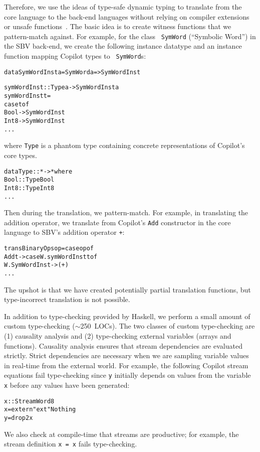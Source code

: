\documentclass[9pt]{sigplanconf}
\newenvironment{code}{\begin{alltt}\footnotesize}{\end{alltt}}
\begin{document}
Therefore, we use the ideas of type-safe dynamic typing to translate from the
core language to the back-end languages without relying on compiler extensions
or unsafe functions~\cite{typing}.  The basic idea is to create witness
functions that we pattern-match against.  For example, for the class {\tt
  SymWord} (``Symbolic Word'') in the SBV back-end, we create the following
instance datatype and an instance function mapping Copilot types to {\tt
  SymWord}s:
%
\begin{code}
data SymWordInst a = SymWord a => SymWordInst

symWordInst :: Type a -> SymWordInst a
symWordInst t =
  case t of
    Bool   -> SymWordInst
    Int8   -> SymWordInst
    ...
\end{code}
%
where {\tt Type} is a phantom type containing concrete representations of
Copilot's core types.
%
\begin{code}
data Type :: * -> * where
  Bool    :: Type Bool
  Int8    :: Type Int8
  ...  
\end{code}
%
Then during the translation, we pattern-match.  For example, in translating the
addition operator, we translate from Copilot's {\tt Add} constructor in the core
language to SBV's addition operator {\tt +}:
%
\begin{code}
transBinaryOps op = case op of
  Add t -> case W.symWordInst t of 
             W.SymWordInst ->  (+)
  ...
\end{code}
%
The upshot is that we have created potentially partial translation functions,
but type-incorrect translation is not possible.








In addition to type-checking provided by Haskell, we perform a small amount of
custom type-checking ($\sim$250~LOCs).  The two classes of custom type-checking
are (1) causality analysis and (2) type-checking external variables (arrays and
functions).  Causality analysis ensures that stream dependencies are evaluated
strictly.  Strict dependencies are necessary when we are sampling variable
values in real-time from the external world.  For example, the following Copilot
stream equations fail type-checking since {\tt y} initially depends on values
from the variable {\tt x} before any values have been generated:
%
\begin{code}
x :: Stream Word8
x = extern "ext" Nothing
y = drop 2 x 
\end{code}
%
We also check at compile-time that streams are productive; for example, the
stream definition {\tt x = x} fails type-checking.
\end{document}
